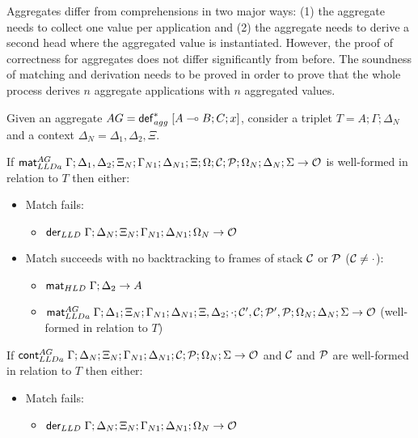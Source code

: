 
Aggregates differ from comprehensions in two major ways: (1) the aggregate needs to
collect one value per application and (2) the aggregate needs to derive a second
head where the aggregated value is instantiated. However, the proof of
correctness for aggregates does not differ significantly from before. The
soundness of matching and derivation needs to be proved in order to prove that
the whole process derives $n$ aggregate applications with $n$ aggregated values.

\begin{lemma}\label{thm:aggregate_body_match}
Given an aggregate $AG = \mathsf{def}_{agg}^{*} \; [A \multimap B ; C; x]$, consider a triplet $T = A; \Gamma;
\Delta_{N}$ and a context $\Delta_{N} = \Delta_1, \Delta_2, \Xi$.

If $\mathsf{mat}_{LLDa}^{AG} \; \Gamma; \Delta_1, \Delta_2; \Xi_N; \Gamma_{N1}; \Delta_{N1}; \Xi;
\Omega; \mathcal{C}; \mathcal{P}; \Omega_N; \Delta_N; \Sigma \rightarrow \mathcal{O}$ is well-formed in relation to $T$ then either:

\begin{itemize}[leftmargin=*]
   \item Match fails:
   \begin{itemize}[leftmargin=\secondm]
      \item $\mathsf{der}_{LLD} \; \Gamma; \Delta_N; \Xi_N; \Gamma_{N1}; \Delta_{N1}; \Omega_N \rightarrow \mathcal{O}$
   \end{itemize}
   
   \item Match succeeds with no backtracking to frames of stack $\mathcal{C}$
   or $\mathcal{P}$ ($\mathcal{C} \neq \cdot$):

   \begin{itemize}[leftmargin=\secondm]
      \item $\mathsf{mat}_{HLD} \; \Gamma; \Delta_2 \rightarrow A$
      \item $\mathsf{mat}_{LLDa}^{AG} \; \Gamma; \Delta_1; \Xi_N; \Gamma_{N1}; \Delta_{N1}; \Xi,
         \Delta_2; \cdot; \mathcal{C'}, \mathcal{C}; \mathcal{P'}, \mathcal{P};
   \Omega_N; \Delta_N; \Sigma \rightarrow \mathcal{O}$ (well-formed in relation to $T$)
   \end{itemize}

   

\end{itemize}

If $\mathsf{cont}_{LLDa}^{AG} \; \Gamma; \Delta_{N}; \Xi_{N}; \Gamma_{N1}; \Delta_{N1};
\mathcal{C}; \mathcal{P}; \Omega_N; \Sigma \rightarrow \mathcal{O}$ and $\mathcal{C}$ and
$\mathcal{P}$ are well-formed in relation to $T$ then either:

\begin{itemize}[leftmargin=*]
   \item Match fails:
   \begin{itemize}[leftmargin=\secondm]
      \item $\mathsf{der}_{LLD} \; \Gamma; \Delta_N; \Xi_N; \Gamma_{N1}; \Delta_{N1}; \Omega_N \rightarrow \mathcal{O}$
   \end{itemize}

   
   
\end{itemize}
\end{lemma}

